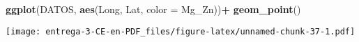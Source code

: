 \documentclass[
]{article}
\newenvironment{Shaded}{\begin{snugshade}}{\end{snugshade}}
\newcommand{\DataTypeTok}[1]{\textcolor[rgb]{0.13,0.29,0.53}{#1}}
\newcommand{\DecValTok}[1]{\textcolor[rgb]{0.00,0.00,0.81}{#1}}
\newcommand{\KeywordTok}[1]{\textcolor[rgb]{0.13,0.29,0.53}{\textbf{#1}}}
\newcommand{\NormalTok}[1]{#1}
\newcommand{\OperatorTok}[1]{\textcolor[rgb]{0.81,0.36,0.00}{\textbf{#1}}}
\newcommand{\StringTok}[1]{\textcolor[rgb]{0.31,0.60,0.02}{#1}}
\begin{document}
\begin{Shaded}
\begin{Highlighting}[]
\KeywordTok{ggplot}\NormalTok{(DATOS, }\KeywordTok{aes}\NormalTok{(Long, Lat, }\DataTypeTok{color =}\NormalTok{ Mg_Zn))}\OperatorTok{+}
\StringTok{  }\KeywordTok{geom_point}\NormalTok{()}
\end{Highlighting}
\end{Shaded}

\texttt{[image: entrega-3-CE-en-PDF\_files/figure-latex/unnamed-chunk-37-1.pdf]}

\begin{Shaded}
\end{Shaded}
\end{document}
